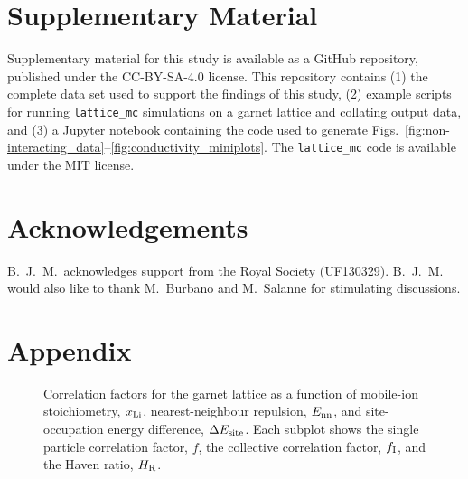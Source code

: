 \documentclass[aps,prb,twocolumn,superscriptaddress,reprint]{revtex4-1}
\newcommand{\xLi}{x_\m{Li}}
\begin{document}
\section{Supplementary Material}
Supplementary material for this study is available as a GitHub repository, published under the CC-BY-SA-4.0 license.\cite{morgan_benjamin_j_2017_821864} This repository contains (1) the complete data set used to support the findings of this study, (2) example scripts for running \texttt{lattice\_mc} simulations on a garnet lattice and collating output data, and (3) a Jupyter notebook containing the code used to generate Figs.\ \ref{fig:non-interacting_data}--\ref{fig:conductivity_miniplots}. The \texttt{lattice\_mc} code is available under the MIT license.\cite{Morgan_JOSS2017}

\section{Acknowledgements}
B.\ J.\ M.\ acknowledges support from the Royal Society (UF130329). 
B.\ J.\ M. would also like to thank M.~Burbano and M.~Salanne for stimulating discussions.

\section{Appendix}

\renewcommand{\thefigure}{A\arabic{figure}}
\setcounter{figure}{0}

\begin{figure}[tb]
  \centering
    \caption{\label{fig:correlation_miniplots}Correlation factors for the garnet lattice as a function of mobile-ion stoichiometry, $\xLi$, nearest-neighbour repulsion, $E_{\mathrm{nn}}$, and site-occupation energy difference, $\Delta E_{\mathrm{site}}$. Each subplot shows the single particle correlation factor, $f$, the collective correlation factor, $f_{\mathrm{I}}$, and the Haven ratio, $H_{\mathrm{R}}$.}
\end{figure}
\end{document}
